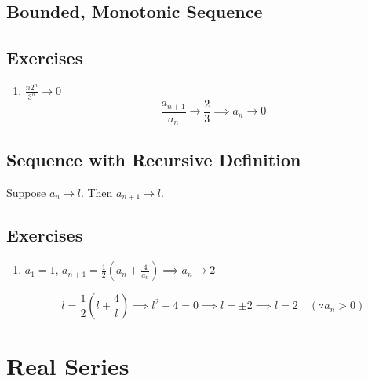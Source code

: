 \subsection{Bounded, Monotonic Sequence}

\subsection*{Exercises}
\begin{enumerate}
	\item $\frac{n2^n}{3^n} \to 0$
		$$ \frac{a_{n+1}}{a_n} \to \frac{2}{3} \implies a_n \to 0 $$
\end{enumerate}

\subsection{Sequence with Recursive Definition}
	Suppose $a_n \to l$. Then $a_{n+1} \to l$.

\subsection*{Exercises}
\begin{enumerate}
	\item $a_1 = 1$, $a_{n+1} = \frac{1}{2} \left(a_n + \frac{4}{a_n}\right) \implies a_n \to 2$

		$$ l = \frac{1}{2}\left(l+\frac{4}{l}\right) \implies l^2-4 = 0 \implies l = \pm 2 \implies l = 2 \quad (\because a_n > 0) $$
\end{enumerate}

\section{Real Series}

